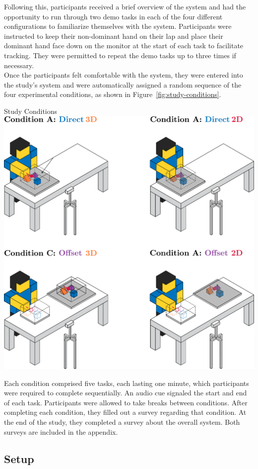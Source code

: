 Following this, participants received a brief overview of the system and had the opportunity to run through two demo tasks in each of the four different configurations to familiarize themselves with the system. Participants were instructed to keep their non-dominant hand on their lap and place their dominant hand face down on the monitor at the start of each task to facilitate tracking. They were permitted to repeat the demo tasks up to three times if necessary. \\

Once the participants felt comfortable with the system, they were entered into the study's system and were automatically assigned a random sequence of the four experimental conditions, as shown in Figure~\ref{fig:study-conditions}.

\begin{figureBox}[label={fig:study-conditions}, width=0.8\linewidth]{Study Conditions}
\includegraphics[width = 0.8\linewidth]{./implementation/figures/study-conditions.pdf}
\end{figureBox}

Each condition comprised five tasks, each lasting one minute, which participants were required to complete sequentially. An audio cue signaled the start and end of each task. Participants were allowed to take breaks between conditions. After completing each condition, they filled out a survey regarding that condition. At the end of the study, they completed a survey about the overall system. Both surveys are included in the appendix.
\subsection{Setup}

